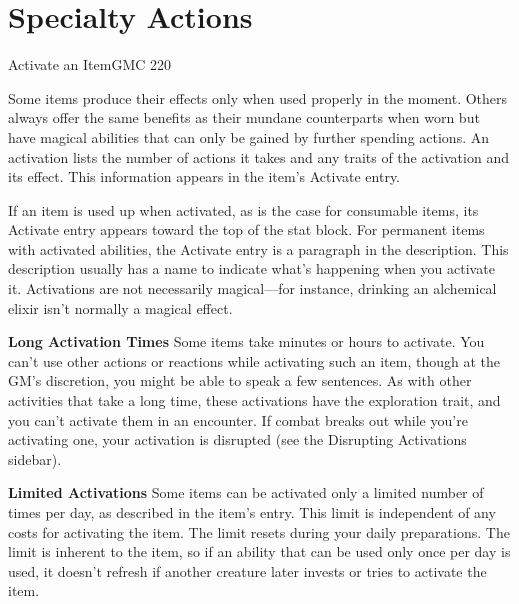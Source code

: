 \documentclass[12pt,openany,twocolumn]{book}
\begin{document}
\section*{Specialty Actions}

\begin{action}{Activate an Item}{}{GMC 220}
    \begin{actioninfo}
    \end{actioninfo}

    \begin{actionbody}
        Some items produce their effects only when used properly in the moment. Others always offer the same benefits as their mundane counterparts when worn but have magical abilities that can only be gained by further spending actions. An activation lists the number of actions it takes and any traits of the activation and its effect. This information appears in the item's Activate entry.

        If an item is used up when activated, as is the case for consumable items, its Activate entry appears toward the top of the stat block. For permanent items with activated abilities, the Activate entry is a paragraph in the description. This description usually has a name to indicate what's happening when you activate it. Activations are not necessarily magical—for instance, drinking an alchemical elixir isn't normally a magical effect.

        \textbf{Long Activation Times} Some items take minutes or hours to activate. You can't use other actions or reactions while activating such an item, though at the GM's discretion, you might be able to speak a few sentences. As with other activities that take a long time, these activations have the exploration trait, and you can't activate them in an encounter. If combat breaks out while you're activating one, your activation is disrupted (see the Disrupting Activations sidebar).

        \textbf{Limited Activations} Some items can be activated only a limited number of times per day, as described in the item's entry. This limit is independent of any costs for activating the item. The limit resets during your daily preparations. The limit is inherent to the item, so if an ability that can be used only once per day is used, it doesn't refresh if another creature later invests or tries to activate the item.


\end{actionbody}
\end{action}
\end{document}

